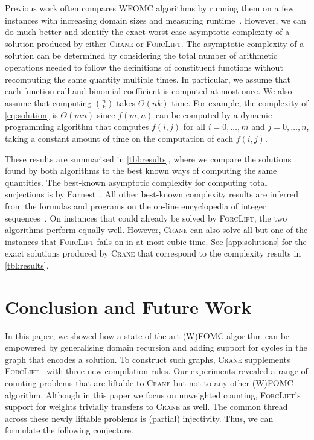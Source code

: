 \documentclass{article}
\theoremstyle{definition}
\begin{document}
Previous work often compares WFOMC algorithms by running them on a few instances
with increasing domain sizes and measuring
runtime~\cite{DBLP:conf/nips/Broeck11,DBLP:conf/ijcai/BroeckTMDR11,DBLP:conf/aaai/BroeckD12}.
However, we can do much better and identify the exact worst-case asymptotic
complexity of a solution produced by either \textsc{Crane} or \textsc{ForcLift}.
The asymptotic complexity of a solution can be determined by considering the
total number of arithmetic operations needed to follow the definitions of
constituent functions without recomputing the same quantity multiple times. In
particular, we assume that each function call and binomial coefficient is
computed at most once. We also assume that computing $\binom{n}{k}$ takes
$\Theta(nk)$ time. For example, the complexity of \cref{eq:solution} is
$\Theta(mn)$ since $f(m, n)$ can be computed by a dynamic programming algorithm
that computes $f(i, j)$ for all $i = 0, \dots, m$ and $j = 0, \dots, n$, taking
a constant amount of time on the computation of each $f(i, j)$.

These results are summarised in \cref{tbl:results}, where we compare the
solutions found by both algorithms to the best known ways of computing the same
quantities. The best-known asymptotic complexity for computing total surjections
is by Earnest~. All other best-known complexity results are
inferred from the formulas and programs on the on-line encyclopedia of integer
sequences~\cite{oeis}. On instances that could already be solved by
\textsc{ForcLift}, the two algorithms perform equally well. However,
\textsc{Crane} can also solve all but one of the instances that
\textsc{ForcLift} fails on in at most cubic time. See \cref{app:solutions} for
the exact solutions produced by \textsc{Crane} that correspond to the complexity
results in \cref{tbl:results}.

\section{Conclusion and Future Work}\label{sec:conclusion}

In this paper, we showed how a state-of-the-art (W)FOMC algorithm can be
empowered by generalising domain recursion and adding support for cycles in the
graph that encodes a solution. To construct such graphs, \textsc{Crane}
supplements \textsc{ForcLift}~\cite{DBLP:conf/ijcai/BroeckTMDR11} with three
new compilation rules. Our experiments revealed a range of counting problems
that are liftable to \textsc{Crane} but not to any other (W)FOMC algorithm.
Although in this paper we focus on unweighted counting, \textsc{ForcLift}'s
support for weights trivially transfers to \textsc{Crane} as well. The common
thread across these newly liftable problems is (partial) injectivity. Thus, we
can formulate the following conjecture.
\end{document}
